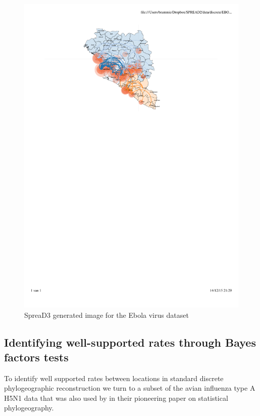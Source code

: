 \documentclass[english]{paper}
\def \spreadname {SpreaD3}
\begin{document}
\begin{figure}%
\centering
\includegraphics[width=1\textwidth]{./figures/Fig6_ebov.pdf} %
\caption{{\spreadname} generated image for the Ebola virus dataset}
\label{fig:ebov_final}
\end{figure}


\subsection{Identifying well-supported rates through Bayes factors tests}
\label{BayesFactor}

To identify well supported rates between locations in standard discrete phylogeographic reconstruction we turn to a subset of the avian influenza type A H5N1 data that was also used by \citet{lemey:2009fk} in their pioneering paper on statistical phylogeography.
\end{document}
